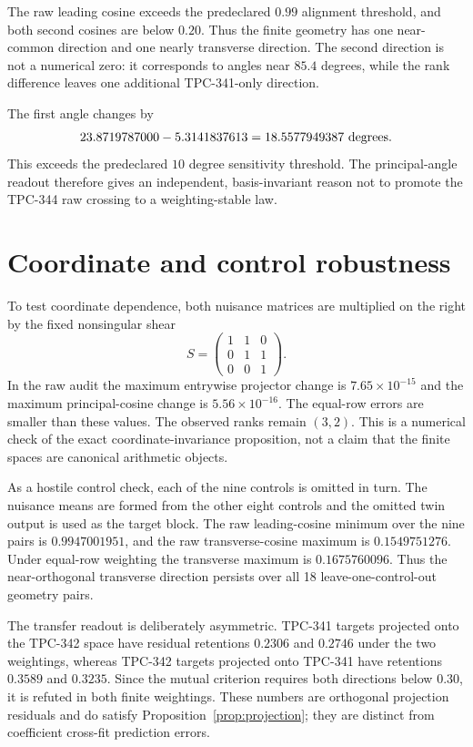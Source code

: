 \documentclass[11pt]{article}
\begin{document}
The raw leading cosine exceeds the predeclared $0.99$ alignment threshold,
and both second cosines are below $0.20$.  Thus the finite geometry has one
near-common direction and one nearly transverse direction.  The second
direction is not a numerical zero: it corresponds to angles near $85.4$
degrees, while the rank difference leaves one additional TPC-341-only
direction.

The first angle changes by
\[
 23.8719787000-5.3141837613
 =18.5577949387\ {\rm degrees}.
\]
This exceeds the predeclared $10$ degree sensitivity threshold.  The
principal-angle readout therefore gives an independent, basis-invariant
reason not to promote the TPC-344 raw crossing to a weighting-stable law.

\section{Coordinate and control robustness}

To test coordinate dependence, both nuisance matrices are multiplied on the
right by the fixed nonsingular shear
\[
 S=\begin{pmatrix}1&1&0\\0&1&1\\0&0&1\end{pmatrix}.
\]
In the raw audit the maximum entrywise projector change is
$7.65\times10^{-15}$ and the maximum principal-cosine change is
$5.56\times10^{-16}$.  The equal-row errors are smaller than these values.
The observed ranks remain $(3,2)$.  This is a numerical check of the exact
coordinate-invariance proposition, not a claim that the finite spaces are
canonical arithmetic objects.

As a hostile control check, each of the nine controls is omitted in turn.
The nuisance means are formed from the other eight controls and the omitted
twin output is used as the target block.  The raw leading-cosine minimum over
the nine pairs is $0.9947001951$, and the raw transverse-cosine maximum is
$0.1549751276$.  Under equal-row weighting the transverse maximum is
$0.1675760096$.  Thus the near-orthogonal transverse direction persists over
all 18 leave-one-control-out geometry pairs.

The transfer readout is deliberately asymmetric.  TPC-341 targets projected
onto the TPC-342 space have residual retentions $0.2306$ and $0.2746$ under
the two weightings, whereas TPC-342 targets projected onto TPC-341 have
retentions $0.3589$ and $0.3235$.  Since the mutual criterion requires both
directions below $0.30$, it is refuted in both finite weightings.  These
numbers are orthogonal projection residuals and do satisfy
Proposition~\ref{prop:projection}; they are distinct from coefficient
cross-fit prediction errors.
\end{document}
